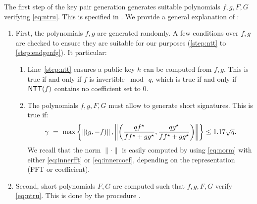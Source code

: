 The first step of the key pair generation generates suitable polynomials $f,g,F,G$ verifying \eqref{eq:ntru}. This is specified in \longntrugen. We provide a general explanation of \ntrugen:
\begin{enumerate}
 \item First, the polynomials $f,g$ are generated randomly. A few conditions over $f,g$ are checked to ensure they are suitable for our purposes (\cref{step:ntt} to \cref{step:endgenfg}). It particular:
 \begin{enumerate}
  \item Line~\ref{step:ntt} ensures a public key $h$ can be computed from $f,g$. This is true if and only if $f$ is invertible $\bmod\ q$, which is true if and only if $\textsf{NTT}(f)$ contains no coefficient set to $0$.
  \item The polynomials $f,g,F,G$ must allow to generate short signatures. This is true if:
  \begin{equation}
  \gamma~=~\max \left\{ \left\|(g,-f)\right\|,  \left\|\left(\frac{qf^\star}{ff^\star + gg^\star},\frac{qg^\star}{ff^\star + gg^\star}\right)\right\| \right\} \leq 1.17\sqrt{q}.
  \end{equation}
  We recall that the norm $\|\cdot\|$ is easily computed by using \eqref{eq:norm} with either \eqref{eq:innerfft} or \eqref{eq:innercoef}, depending on the representation (FFT or coefficient).
 \end{enumerate}
 \item Second, short polynomials $F,G$ are computed such that $f,g,F,G$ verify \eqref{eq:ntru}. This is done by the procedure \longntrusolve.
 \end{enumerate}
 
